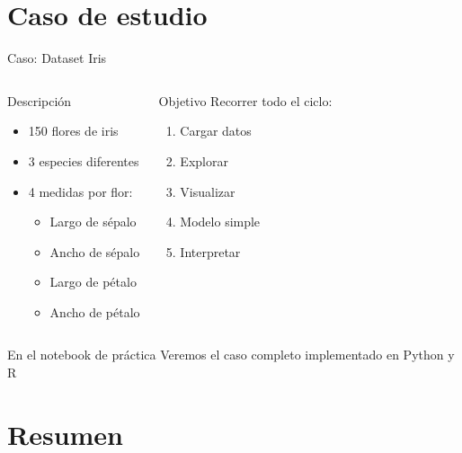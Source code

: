 \documentclass[aspectratio=169]{beamer}
\begin{document}
\section{Caso de estudio}

\begin{frame}{Caso: Dataset Iris}
\begin{columns}[t]
\begin{block}{Descripción}
\begin{itemize}
    \item 150 flores de iris
    \item 3 especies diferentes
    \item 4 medidas por flor:
    \begin{itemize}
        \item Largo de sépalo
        \item Ancho de sépalo
        \item Largo de pétalo
        \item Ancho de pétalo
    \end{itemize}
\end{itemize}
\end{block}

\begin{block}{Objetivo}
Recorrer todo el ciclo:
\begin{enumerate}
    \item Cargar datos
    \item Explorar
    \item Visualizar
    \item Modelo simple
    \item Interpretar
\end{enumerate}
\end{block}
\end{columns}

\vspace{1em}

\begin{alertblock}{En el notebook de práctica}
Veremos el caso completo implementado en Python y R
\end{alertblock}
\end{frame}

\section{Resumen}
\end{document}
